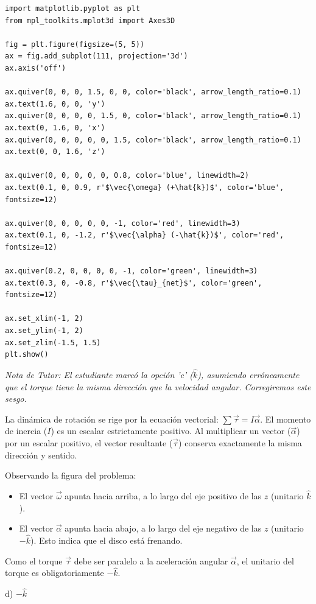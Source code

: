 \documentclass[12pt, a4paper]{article}
\begin{document}
\begin{verbatim}
import matplotlib.pyplot as plt
from mpl_toolkits.mplot3d import Axes3D

fig = plt.figure(figsize=(5, 5))
ax = fig.add_subplot(111, projection='3d')
ax.axis('off')

ax.quiver(0, 0, 0, 1.5, 0, 0, color='black', arrow_length_ratio=0.1)
ax.text(1.6, 0, 0, 'y')
ax.quiver(0, 0, 0, 0, 1.5, 0, color='black', arrow_length_ratio=0.1)
ax.text(0, 1.6, 0, 'x')
ax.quiver(0, 0, 0, 0, 0, 1.5, color='black', arrow_length_ratio=0.1)
ax.text(0, 0, 1.6, 'z')

ax.quiver(0, 0, 0, 0, 0, 0.8, color='blue', linewidth=2)
ax.text(0.1, 0, 0.9, r'$\vec{\omega} (+\hat{k})$', color='blue', fontsize=12)

ax.quiver(0, 0, 0, 0, 0, -1, color='red', linewidth=3)
ax.text(0.1, 0, -1.2, r'$\vec{\alpha} (-\hat{k})$', color='red', fontsize=12)

ax.quiver(0.2, 0, 0, 0, 0, -1, color='green', linewidth=3)
ax.text(0.3, 0, -0.8, r'$\vec{\tau}_{net}$', color='green', fontsize=12)

ax.set_xlim(-1, 2)
ax.set_ylim(-1, 2)
ax.set_zlim(-1.5, 1.5)
plt.show()
\end{verbatim}

\textit{Nota de Tutor: El estudiante marcó la opción 'c' ($\hat{k}$), asumiendo erróneamente que el torque tiene la misma dirección que la velocidad angular. Corregiremos este sesgo.}

La dinámica de rotación se rige por la ecuación vectorial: $\sum \vec{\tau} = I \vec{\alpha}$.
El momento de inercia ($I$) es un escalar estrictamente positivo. Al multiplicar un vector ($\vec{\alpha}$) por un escalar positivo, el vector resultante ($\vec{\tau}$) conserva exactamente la misma dirección y sentido. 

Observando la figura del problema:
\begin{itemize}
    \item El vector $\vec{\omega}$ apunta hacia arriba, a lo largo del eje positivo de las $z$ (unitario $\hat{k}$).
    \item El vector $\vec{\alpha}$ apunta hacia abajo, a lo largo del eje negativo de las $z$ (unitario $-\hat{k}$). Esto indica que el disco está frenando.
\end{itemize}
Como el torque $\vec{\tau}$ debe ser paralelo a la aceleración angular $\vec{\alpha}$, el unitario del torque es obligatoriamente $-\hat{k}$.

\begin{tcolorbox}[colback=green!5!white, colframe=green!50!black, title=Respuesta Final]
\centering \Large d) $-\hat{k}$
\end{tcolorbox}
\end{document}
